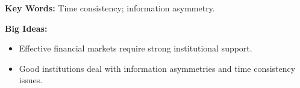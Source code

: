 \textbf{Key Words:} Time consistency; information asymmetry.

\textbf{Big Ideas:}
\begin{itemize}
    \item Effective financial markets require strong institutional support.
    \item Good institutions deal with information asymmetries and time consistency issues.
\end{itemize}
